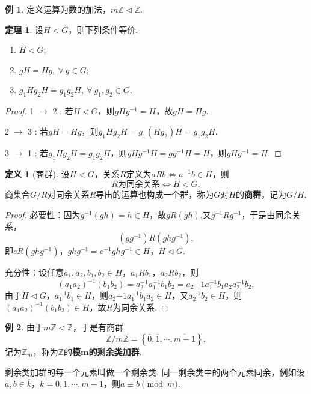 \documentclass[12pt]{ctexart}
\theoremstyle{definition}
\newtheorem{definition}{定义}[section]
\newtheorem{theorem}{定理}[section]
\newtheorem{example}{例}[section]
\theoremstyle{plain}
\begin{document}
\begin{example}
	定义运算为数的加法，$m\mathbb{Z}\vartriangleleft \mathbb{Z}$.
\end{example}
\begin{theorem}
	设$H<G$，则下列条件等价.
	\begin{enumerate}
		\item $H\vartriangleleft G$;
		\item $gH=Hg,\ \forall\ g\in G$;
		\item $g_1Hg_2H=g_1g_2H,\ \forall\ g_1,g_2\in G$.
	\end{enumerate}
\end{theorem}
\begin{proof}
	1 $\to$ 2 : 若$H\vartriangleleft G$，则$gHg^{-1}=H$，故$gH=Hg$.
	
	2 $\to$ 3 : 若$gH=Hg$，则$g_1Hg_2H=g_1(Hg_2)H=g_1g_2H$.
	
	3 $\to$ 1 : 若$g_1Hg_2H=g_1g_2H$，则$gHg^{-1}H=gg^{-1}H=H$，则$gHg^{-1}=H$.
\end{proof}
\begin{definition}[商群]
	设$H<G$，关系$R$定义为$aRb\iff a^{-1}b\in H$，则
	$$R\text{为同余关系}\iff H\vartriangleleft G,$$
	商集合$G/R$对同余关系$R$导出的运算也构成一个群，称为$G$对$H$的\textbf{商群}，记为$G/H$.
\end{definition}
\begin{proof}
	必要性：因为$g^{-1}(gh)=h\in H$，故$gR(gh)$.又$g^{-1}Rg^{-1}$，于是由同余关系，$$(gg^{-1})R(ghg^{-1}),$$即$eR(ghg^{-1})$，$ghg^{-1}=e^{-1}ghg^{-1}\in H$，$H\vartriangleleft G$.
	
	充分性：设任意$a_1,a_2,b_1,b_2\in H$，$a_1Rb_1$，$a_2Rb_2$，则
	$$(a_1a_2)^{-1}(b_1b_2)=a_2^{-1}a_1^{-1}b_1b_2=a_2{-1}a_1^{-1}b_1a_2a_2^{-1}b_2,$$
	由于$H\vartriangleleft G$，$a_1^{-1}b_1\in H$，则$a_2{-1}a_1^{-1}b_1a_2\in H$，又$a_2^{-1}b_2\in H$，则$(a_1a_2)^{-1}(b_1b_2)\in H$，故$R$为同余关系.
\end{proof}
\begin{example}
	由于$m\mathbb{Z}\vartriangleleft\mathbb{Z}$，于是有商群
	$$\mathbb{Z}/m\mathbb{Z}=\left\{\overline{0},\overline{1},\cdots,\overline{m-1}\right\},$$
	记为$\mathbb{Z}_m$，称为$\mathbb{Z}$的\textbf{模$\boldsymbol{m}$的剩余类加群}.
\end{example}
剩余类加群的每一个元素叫做一个剩余类. 同一剩余类中的两个元素同余，例如设$a,b\in\overline{k}$，$k=0,1,\cdots,m-1$，则$a\equiv b\pmod m$. 
\end{document}
